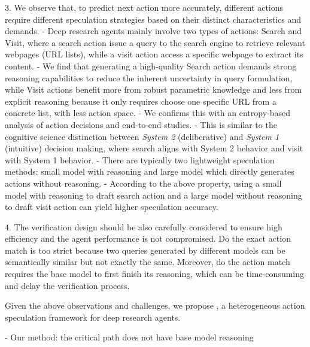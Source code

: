 3. We observe that, to predict next action more accurately, different actions require different speculation strategies based on their distinct characteristics and demands.
    - Deep research agents mainly involve two types of actions: Search and Visit, where a search action issue a query to the search engine to retrieve relevant webpages (URL lists), while a visit action access a specific webpage to extract its content.
    - We find that generating a high-quality Search action demands strong reasoning capabilities to reduce the inherent uncertainty in query formulation, while Visit actions benefit more from robust parametric knowledge and less from explicit reasoning because it only requires choose one specific URL from a concrete list, with less action space. 
    - We confirms this with an entropy-based analysis of action decisions and end-to-end studies.
    - This is similar to the cognitive science distinction between \textit{System 2} (deliberative) and \textit{System 1} (intuitive) decision making, where search aligns with System 2 behavior and visit with System 1 behavior.
    - There are typically two lightweight speculation methods: small model with reasoning and large model which directly generates actions without reasoning.
    - According to the above property, using a small model with reasoning to draft search action and a large model without reasoning to draft visit action can yield higher speculation accuracy.

4. The verification design should be also carefully considered to ensure high efficiency and the agent performance is not compromised. Do the exact action match is too strict because two queries generated by different models can be semantically similar but not exactly the same. Moreover, do the action match requires the base model to first finish its reasoning, which can be time-consuming and delay the verification process. 

Given the above observations and challenges, we propose \method, a heterogeneous action speculation framework for deep research agents.

- Our method: the critical path does not have base model reasoning
\fi


